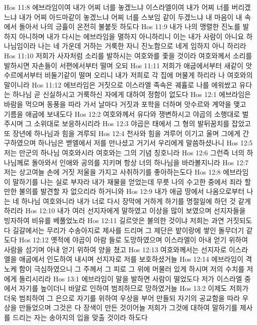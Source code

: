 Hos 11:8  에브라임이여 내가 어찌 너를 놓겠느냐 이스라엘이여 내가 어찌 너를 버리겠느냐 내가 어찌 아드마같이 놓겠느냐 어찌 너를 스보임 같이 두겠느냐 내 마음이 내 속에서 돌아서 나의 긍휼이 온전히 불붙듯 하도다
Hos 11:9  내가 나의 맹렬한 진노를 발하지 아니하며 내가 다시는 에브라임을 멸하지 아니하리니 이는 내가 사람이 아니요 하나님임이라 나는 네 가운데 거하는 거룩한 자니 진노함으로 네게 임하지 아니 하리라
Hos 11:10  저희가 사자처럼 소리를 발하시는 여호와를 좇을 것이라 여호와께서 소리를 발하시면 자손들이 서편에서부터 떨며 오되
Hos 11:11  저희가 애굽에서부터 새같이 앗수르에서부터 비둘기같이 떨며 오리니 내가 저희로 각 집에 머물게 하리라 나 여호와의 말이니라
Hos 11:12  에브라임은 거짓으로 이스라엘 족속은 궤휼로 나를 에워쌌고 유다는 하나님 곧 신실하시고 거룩하신 자에게 대하여 정함이 없도다
Hos 12:1  에브라임은 바람을 먹으며 동풍을 따라 가서 날마다 거짓과 포학을 더하며 앗수르와 계약을 맺고 기름을 애굽에 보내도다
Hos 12:2  여호와께서 유다와 쟁변하시고 야곱의 소행대로 벌주시며 그 소위대로 보응하시리라
Hos 12:3  야곱은 태에서 그 형의 발뒤꿈치를 잡았고 또 장년에 하나님과 힘을 겨루되
Hos 12:4  천사와 힘을 겨루어 이기고 울며 그에게 간구하였으며 하나님은 벧엘에서 저를 만나셨고 거기서 우리에게 말씀하셨나니
Hos 12:5  저는 만군의 하나님 여호와시라 여호와는 그의 기념 칭호니라
Hos 12:6  그런즉 너의 하나님께로 돌아와서 인애와 공의를 지키며 항상 너의 하나님을 바라볼지니라
Hos 12:7  저는 상고여늘 손에 거짓 저울을 가지고 사취하기를 좋아하는도다
Hos 12:8  에브라임이 말하기를 나는 실로 부자라 내가 재물을 얻었는데 무릇 나의 수고한 중에서 죄라 할만한 불의를 발견할 자 없으리라 하거니와
Hos 12:9  내가 애굽 땅에서 나옴으로부터 나는 네 하나님 여호와니라 내가 너로 다시 장막에 거하게 하기를 명절일에 하던 것 같게 하리라
Hos 12:10  내가 여러 선지자에게 말하였고 이상을 많이 보였으며 선지자들을 빙자하여 비유를 베풀었노라
Hos 12:11  길르앗은 불의한 것이냐 저희는 과연 거짓되도다 길갈에서는 무리가 수송아지로 제사를 드리며 그 제단은 밭이랑에 쌓인 돌무더기 같도다
Hos 12:12  옛적에 야곱이 아람 들로 도망하였으며 이스라엘이 아내 얻기 위하여 사람을 섬기며 아내 얻기 위하여 양을 쳤고
Hos 12:13  여호와께서는 선지자로 이스라엘을 애굽에서 인도하여 내시며 선지자로 저를 보호하셨거늘
Hos 12:14  에브라임이 격노케 함이 극심하였으니 그 주께서 그 피로 그 위에 머물러 있게 하시며 저의 수치를 저에게 돌리시리라
Hos 13:1  에브라임이 말을 발하면 사람이 떨었도다 저가 이스라엘 중에서 자기를 높이더니 바알로 인하여 범죄하므로 망하였거늘
Hos 13:2  이제도 저희가 더욱 범죄하여 그 은으로 자기를 위하여 우상을 부어 만들되 자기의 공교함을 따라 우상을 만들었으며 그것은 다 장색이 만든 것이어늘 저희가 그것에 대하여 말하기를 제사를 드리는 자는 송아지의 입을 맞출 것이라 하도다
